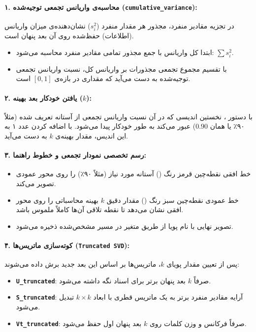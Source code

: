 \documentclass{article}
\begin{document}
    \paragraph{۱. محاسبه‌ی واریانس تجمعی توجیه‌شده (\texttt{cumulative\_variance}):}\hspace{-10pt}
    در تجزیه مقادیر منفرد، مجذور هر مقدار منفرد ($s_i^2$) نشان‌دهنده‌ی میزان واریانس (اطلاعات) حفظ‌شده روی آن بعد پنهان است.
    \begin{itemize}
        \item ابتدا کل واریانس با جمع مجذور تمامی مقادیر منفرد محاسبه می‌شود: $\sum s_i^2$.
        \item با تقسیم مجموع تجمعی مجذورات بر واریانس کل، نسبت واریانس تجمعی توجیه‌شده به دست می‌آید که مقداری در بازه‌ی $[0, 1]$ است.
    \end{itemize}

    \paragraph{۲. یافتن خودکار بعد بهینه ($k$):}\hspace{-10pt}
    با دستور ، نخستین اندیسی که در آن نسبت واریانس تجمعی از آستانه تعریف شده (مثلاً ۹۰٪ یا همان $0.90$) عبور می‌کند به طور خودکار پیدا می‌شود. با اضافه کردن عدد ۱ به این اندیس، مقدار بهینه‌ی $k$ به دست می‌آید.

    \paragraph{۳. رسم تخصصی نمودار تجمعی و خطوط راهنما:}\hspace{-10pt}
    \begin{itemize}
        \item خط افقی نقطه‌چین قرمز رنگ () آستانه مورد نیاز (مثلاً ۹۰٪) را روی محور عمودی تصویر می‌کند.
        \item خط عمودی نقطه‌چین سبز رنگ () مقدار دقیق $k$ بهینه محاسباتی را روی محور افقی نشان می‌دهد تا نقطه تلاقی آن‌ها کاملاً ملموس باشد.
        \item تصویر نهایی با نام پویا از طریق متغیر  در مسیر مشخص‌شده ذخیره می‌شود.
    \end{itemize}

    \paragraph{۴. کوته‌سازی ماتریس‌ها (\texttt{Truncated SVD}):}\hspace{-10pt}
    پس از تعیین مقدار پویای $k$، ماتریس‌ها بر اساس این بعد جدید برش داده می‌شوند:
    \begin{itemize}
        \item \textbf{\texttt{U\_truncated}}: صرفاً $k$ بعد پنهان برتر برای اسناد نگه داشته می‌شود.
        \item \textbf{\texttt{S\_truncated}}: آرایه مقادیر منفرد برتر به یک ماتریس قطری با ابعاد $k \times k$ تبدیل می‌شود.
        \item \textbf{\texttt{Vt\_truncated}}: صرفاً فرکانس و وزن کلمات روی $k$ بعد پنهان اول حفظ می‌شود.
    \end{itemize}
\end{document}
